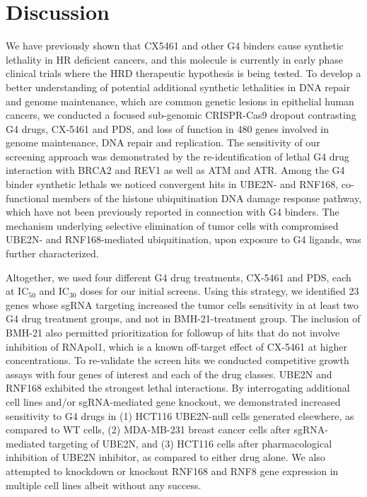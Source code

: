 \section*{Discussion}

We have previously shown that CX5461 and other G4 binders cause synthetic lethality in HR deficient cancers, and this molecule is currently in early phase clinical trials where the HRD therapeutic hypothesis is being tested. To develop a better understanding of potential additional synthetic lethalities in DNA repair and genome maintenance, which are common genetic lesions in epithelial human cancers, we conducted a focused sub-genomic CRISPR-Cas9 dropout contrasting G4 drugs, CX-5461 and PDS, and loss of function in 480 genes involved in genome maintenance, DNA repair and replication.
The sensitivity of our screening approach was demonstrated by the re-identification of lethal G4 drug interaction with BRCA2 and REV1\cite{Eddy2014,Zimmer2015,Xu2017} as well as ATM and ATR\cite{Negi2015a,Quin2016}.
Among the G4 binder synthetic lethals we noticed convergent hits in UBE2N- and RNF168, co-functional members of the histone ubiquitination DNA damage response pathway, which have not been previously reported in connection with G4 binders. The mechanism underlying selective elimination of tumor cells with compromised UBE2N- and RNF168-mediated ubiquitination, upon exposure to G4 ligands, was further characterized.

Altogether, we used four different G4 drug treatments, CX-5461 and PDS, each at IC$_{50}$ and IC$_{30}$ doses for our initial screens. Using this strategy, we identified 23 genes whose sgRNA targeting increased the tumor cells sensitivity in at least two G4 drug treatment groups, and not in BMH-21-treatment group.  The inclusion of BMH-21 also permitted prioritization for followup of hits that do not involve inhibition of RNApol1, which is a known off-target effect of CX-5461 at higher concentrations\cite{Xu2017}. To re-validate the screen hits we conducted competitive growth assays with four genes of interest and each of the drug classes. UBE2N and RNF168 exhibited the strongest lethal interactions. By interrogating additional cell lines and/or sgRNA-mediated gene knockout, we demonstrated increased sensitivity to G4 drugs in (1) HCT116 UBE2N-null cells generated elsewhere\cite{Thorslund2015}, as compared to WT cells, (2) MDA-MB-231 breast cancer cells after sgRNA-mediated targeting of UBE2N, and (3) HCT116 cells after pharmacological inhibition of UBE2N inhibitor, as compared to either drug alone. We also attempted to knockdown or knockout RNF168 and RNF8 gene expression in multiple cell lines albeit without any success.  
 
